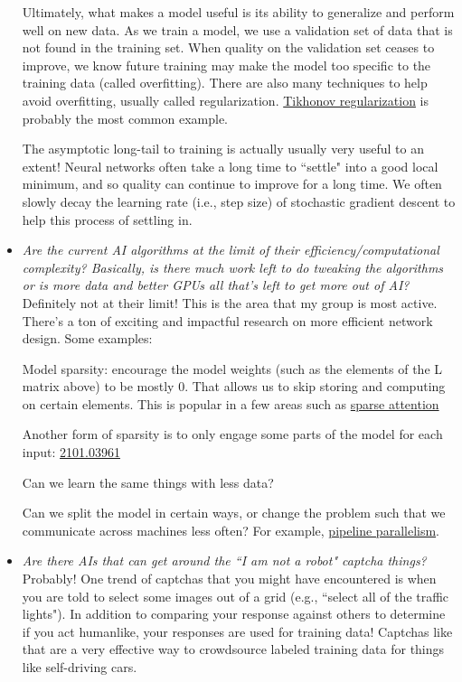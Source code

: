 \documentclass[11pt]{homework}
\begin{document}
\begin{itemize}
Ultimately, what makes a model useful is its ability to generalize and perform well on new data. As we train a model, we use a validation set of data that is not found in the training set. When quality on the validation set ceases to improve, we know future training may make the model too specific to the training data (called overfitting). There are also many techniques to help avoid overfitting, usually called regularization. \href{https://en.wikipedia.org/wiki/Tikhonov_regularization}{Tikhonov regularization} is probably the most common example.

The asymptotic long-tail to training is actually usually very useful to an extent! Neural networks often take a long time to ``settle" into a good local minimum, and so quality can continue to improve for a long time. We often slowly decay the learning rate (i.e., step size) of stochastic gradient descent to help this process of settling in.

\item {\em Are the current AI algorithms at the limit of their efficiency/computational complexity? Basically, is there much work left to do tweaking the algorithms or is more data and better GPUs all that's left to get more out of AI?}\\
Definitely not at their limit! This is the area that my group is most active. There's a ton of exciting and impactful research on more efficient network design. Some examples:

Model sparsity: encourage the model weights (such as the elements of the L matrix above) to be mostly 0. That allows us to skip storing and computing on certain elements. This is popular in a few areas such as \href{https://www.deepspeed.ai/news/2020/09/08/sparse-attention.html}{sparse attention}

Another form of sparsity is to only engage some parts of the model for each input: \href{https://arxiv.org/abs/2101.03961}{2101.03961}

Can we learn the same things with less data?

Can we split the model in certain ways, or change the problem such that we communicate across machines less often? For example, \href{https://www.microsoft.com/en-us/research/blog/pipedream-a-more-effective-way-to-train-deep-neural-networks-using-pipeline-parallelism/}{pipeline parallelism}.

\item {\em Are there AIs that can get around the ``I am not a robot" captcha things?} \\
Probably! One trend of captchas that you might have encountered is when you are told to select some images out of a grid (e.g., ``select all of the traffic lights"). In addition to comparing your response against others to determine if you act humanlike, your responses are used for training data! Captchas like that are a very effective way to crowdsource labeled training data for things like self-driving cars.


\end{itemize}
\end{document}
